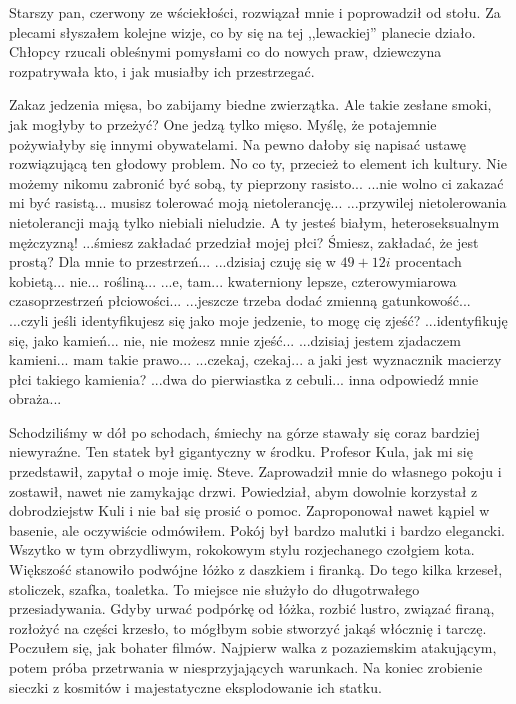 Starszy pan, czerwony ze wściekłości, rozwiązał mnie i poprowadził od stołu. 
Za plecami słyszałem kolejne wizje, co by się na tej ,,lewackiej'' planecie działo.
Chłopcy rzucali obleśnymi pomysłami co do nowych praw, dziewczyna rozpatrywała kto, i jak musiałby ich przestrzegać.
\begin{dialogue}
\ds{} Zakaz jedzenia mięsa, bo zabijamy biedne zwierzątka.
\ds{} Ale takie zesłane smoki, jak mogłyby to przeżyć? One jedzą tylko mięso.
\ds{} Myślę, że potajemnie pożywiałyby się innymi obywatelami.
\ds{} Na pewno dałoby się napisać ustawę rozwiązującą ten głodowy problem.
\ds{} No co ty, przecież to element ich kultury. Nie możemy nikomu zabronić być sobą, ty pieprzony rasisto...
\ds{} ...nie wolno ci zakazać mi być rasistą... musisz tolerować moją nietolerancję...
\ds{} ...przywilej nietolerowania nietolerancji mają tylko niebiali nieludzie. A ty jesteś białym, heteroseksualnym mężczyzną!
\ds{} ...śmiesz zakładać przedział mojej płci? Śmiesz, zakładać, że jest prostą? Dla mnie to przestrzeń...
\ds{} ...dzisiaj czuję się w $49 + 12i$ procentach kobietą... nie... rośliną...
\ds{} ...e, tam... kwaterniony lepsze, czterowymiarowa czasoprzestrzeń płciowości...
\ds{} ...jeszcze trzeba dodać zmienną gatunkowość...
\ds{} ...czyli jeśli identyfikujesz się jako moje jedzenie, to mogę cię zjeść?
\ds{} ...identyfikuję się, jako kamień... nie, nie możesz mnie zjeść...
\ds{} ...dzisiaj jestem zjadaczem kamieni... mam takie prawo...
\ds{} ...czekaj, czekaj... a jaki jest wyznacznik macierzy płci takiego kamienia?
\ds{} ...dwa do pierwiastka z cebuli... inna odpowiedź mnie obraża...
\end{dialogue}

Schodziliśmy w dół po schodach, śmiechy na górze stawały się coraz bardziej niewyraźne.
Ten statek był gigantyczny w środku. Profesor Kula, jak mi się przedstawił, zapytał o moje imię. Steve.
Zaprowadził mnie do własnego pokoju i zostawił, nawet nie zamykając drzwi. 
Powiedział, abym dowolnie korzystał z dobrodziejstw Kuli i nie bał się prosić o pomoc. 
Zaproponował nawet kąpiel w basenie, ale oczywiście odmówiłem.
Pokój był bardzo malutki i bardzo elegancki.
Wszytko w tym obrzydliwym, rokokowym stylu rozjechanego czołgiem kota.
Większość stanowiło podwójne łóżko z daszkiem i firanką.
Do tego kilka krzeseł, stoliczek, szafka, toaletka.
To miejsce nie służyło do długotrwałego przesiadywania.
Gdyby urwać podpórkę od łóżka, rozbić lustro, związać firaną, rozłożyć na części krzesło, to mógłbym sobie stworzyć jakąś włócznię i tarczę.
Poczułem się, jak bohater filmów. Najpierw walka z pozaziemskim atakującym, potem próba przetrwania w niesprzyjających warunkach.
Na koniec zrobienie sieczki z kosmitów i majestatyczne eksplodowanie ich statku.

